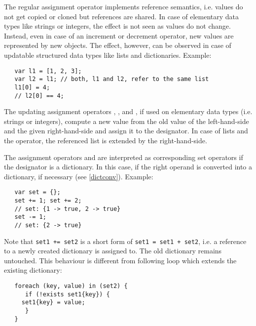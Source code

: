 \noindent
The regular assignment operator \token{=} implements reference semantics,
i.e. values do not get copied or cloned but references are shared. In
case of elementary data types like strings or integers, the effect is
not seen as values do not change. Instead, even in case of an increment
or decrement operator, new values are represented by new objects. The
effect, however, can be observed in case of updatable structured data types
like lists and dictionaries. Example:

\begin{lstlisting}
   var l1 = [1, 2, 3];
   var l2 = l1; // both, l1 and l2, refer to the same list
   l1[0] = 4;
   // l2[0] == 4;
\end{lstlisting}

\noindent
The updating assignment operators \token{\&=}, \token{+=}, and \token{-=},
if used on elementary data types (i.e. strings or integers),
compute a new value from the old value of the left-hand-side
and the given right-hand-side and assign it to the designator.
In case of lists and the \token{\&=} operator, the referenced list
is extended by the right-hand-side.

\label{setassignment}
The assignment operators \token{+=} and \token{-=} are interpreted
as corresponding set operators if the designator is a
dictionary.
In this case, if the right operand is converted into a dictionary,
if necessary (see \ref{dictconv}). Example:

\begin{lstlisting}
   var set = {};
   set += 1; set += 2;
   // set: {1 -> true, 2 -> true}
   set -= 1;
   // set: {2 -> true}
\end{lstlisting}

\noindent
Note that \lstinline!set1 += set2! is a short form of
\lstinline!set1 = set1 + set2!, i.e. a reference to a newly
created dictionary is assigned to. The old dictionary remains
untouched. This behaviour is different from following loop
which extends the existing dictionary:

\begin{lstlisting}
   foreach (key, value) in (set2) {
      if (!exists set1{key}) {
	 set1{key} = value;
      }
   }
\end{lstlisting}

\endinput
